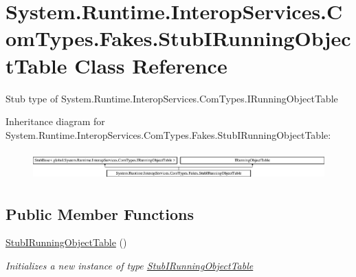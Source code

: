 \hypertarget{class_system_1_1_runtime_1_1_interop_services_1_1_com_types_1_1_fakes_1_1_stub_i_running_object_table}{\section{System.\-Runtime.\-Interop\-Services.\-Com\-Types.\-Fakes.\-Stub\-I\-Running\-Object\-Table Class Reference}
\label{class_system_1_1_runtime_1_1_interop_services_1_1_com_types_1_1_fakes_1_1_stub_i_running_object_table}
}


Stub type of System.\-Runtime.\-Interop\-Services.\-Com\-Types.\-I\-Running\-Object\-Table 


Inheritance diagram for System.\-Runtime.\-Interop\-Services.\-Com\-Types.\-Fakes.\-Stub\-I\-Running\-Object\-Table\-:\begin{figure}[H]
\begin{center}
\leavevmode
\includegraphics[height=1.120000cm]{class_system_1_1_runtime_1_1_interop_services_1_1_com_types_1_1_fakes_1_1_stub_i_running_object_table}
\end{center}
\end{figure}
\subsection*{Public Member Functions}
\begin{DoxyCompactItemize}
\item 
\hyperlink{class_system_1_1_runtime_1_1_interop_services_1_1_com_types_1_1_fakes_1_1_stub_i_running_object_table_ade4ac79e2194a0bb4df4427045d8a51c}{Stub\-I\-Running\-Object\-Table} ()
\begin{DoxyCompactList}\small\item\em Initializes a new instance of type \hyperlink{class_system_1_1_runtime_1_1_interop_services_1_1_com_types_1_1_fakes_1_1_stub_i_running_object_table}{Stub\-I\-Running\-Object\-Table}\end{DoxyCompactList}\end{DoxyCompactItemize}
